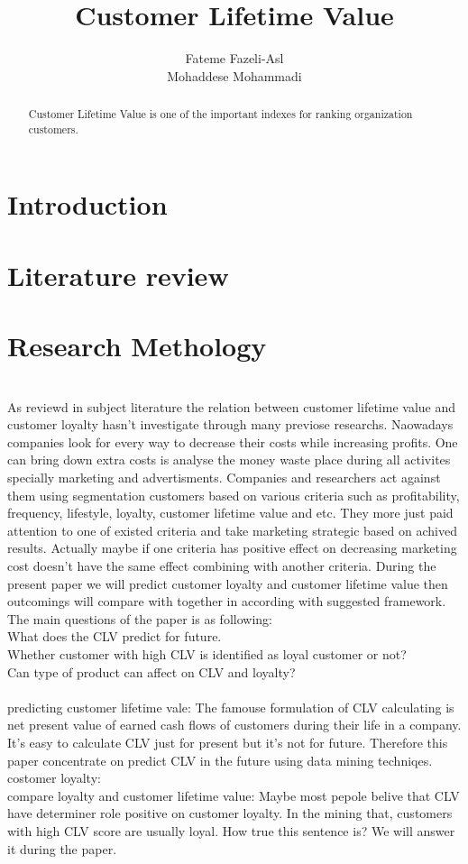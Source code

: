 \documentclass{article}
\title{Customer Lifetime Value}
\author{Fateme Fazeli-Asl \\
Mohaddese Mohammadi}
\begin{document}
\maketitle


\begin{abstract}
Customer Lifetime Value is  one of the important indexes for ranking organization customers.
\end{abstract}

\section{Introduction}\label{sec.Intro}

\section{Literature review}\label{sec.review}

\section{Research Methology}\label{sec.Model}
\\ As reviewd in subject literature the relation between customer lifetime value and customer loyalty hasn't investigate through many previose researchs. Naowadays companies look for every way to decrease their costs while increasing profits. One can bring down extra costs is analyse the money waste place during all activites specially marketing and advertisments. Companies and researchers act against them using segmentation customers based on various criteria such as profitability, frequency, lifestyle, loyalty, customer lifetime value and etc. They more just paid attention to one of existed criteria and take marketing strategic based on achived results. Actually maybe if one criteria has positive effect on decreasing marketing cost doesn't have the same effect combining with another criteria. During the present paper we will predict customer loyalty and customer lifetime value then outcomings will compare with together in according with suggested framework.
The main questions of the paper is as following:\\
What does the CLV predict for future.\\
Whether customer with high CLV is identified as loyal customer or not?\\
Can type of product can affect on CLV and loyalty?\\
\\predicting customer lifetime vale:
The famouse formulation of CLV calculating is net present value of earned cash flows of customers during their life in a company. It's easy to calculate CLV just for present but it's not for future. Therefore this paper concentrate on predict CLV in the future using  data mining techniqes. 
\\costomer loyalty:
\\compare loyalty and customer lifetime value:
Maybe most pepole belive  that CLV have determiner role positive on customer loyalty. In the mining that, customers with high CLV score are usually loyal. How true this sentence is? We will answer it during the paper. 
\end{document}
